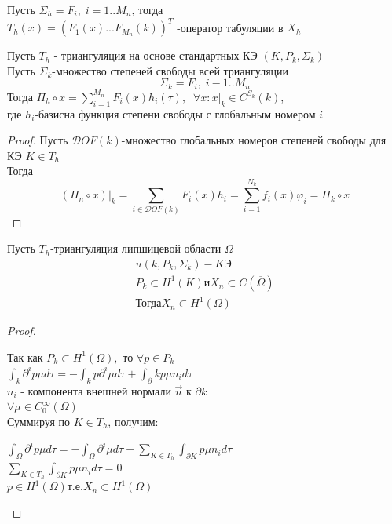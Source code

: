 \documentclass[__main__.tex]{subfiles}
\begin{document}
\begin{definition}
	Пусть $\Sigma_h = {F_i, \; i=1..M_n}$, тогда \\
	$T_h(x) = (F_1(x) ... F_{M_n}(k))^T$ -оператор табуляции в $X_h$
\end{definition}

\begin{theorem}
	Пусть $T_h$ - триангуляция на основе стандартных КЭ $(K, P_k, \Sigma_k)$\\
	Пусть $\Sigma_k$-множество степеней свободы всей триангуляции 
	$$
	\Sigma_k = {F_i, \; i-1..M_n}
	$$
	Тогда $\Pi_h \circ x = \sum_{i=1}^{M_n}F_i(x)h_i(\tau), \;\; \forall x: x|_k \in C^{S_k}(k)$,\\
	где $h_i$-базисна функция степени свободы с глобальным номером $i$
\end{theorem}
\begin{proof}
	Пусть $\mathcal{D}OF(k)$-множество глобальных номеров степеней свободы для КЭ $K \in T_h$\\
	Тогда 
	$$
	(\Pi_n \circ x)|_k = \sum_{i \in \mathcal{D}OF(k)}F_i(x)h_i = \sum_{i=1}^{N_k}f_i(x)\varphi_i = \Pi_k \circ x
		$$
\end{proof}

\begin{theorem}
	Пусть $T_h$-триангуляция липшицевой области $\Omega$
	\begin{gather*}
		u(k, P_k, \Sigma_k) - KЭ\\
		P_k\subset H^1(K) \text{и} X_n \subset C(\overline{\Omega}) \\
		\text{Тогда} X_n \subset H^1(\Omega)
	\end{gather*}
\end{theorem}
\begin{proof}
	\begin{center}
	Так как $P_k \subset H^1(\Omega),$ то $\forall p \in P_k$\\
	$\int_k \partial^i p\mu d\tau = -\int_k p\partial^i \mu d\tau + \int_\partial{k} p\mu n_i d\tau$\\
	$n_i$ - компонента внешней нормали $\vec{n}$ к $\partial{k}$\\
	$\forall \mu \in C_0^\infty (\Omega)$\\
	Суммируя по $K \in T_h$, получим:
	
	$\int_{\Omega} \partial^{i}p\mu d\tau = -\int_{\Omega}\partial^i \mu d\tau + \sum_{K \in T_h} \int_{\partial{K}}p\mu n_i d\tau$\\
	$\sum_{K \in T_h}\int_{\partial{K}}p\mu n_i d\tau = 0$\\
	$p \in H^1(\Omega) \text{т.е.} X_n \subset H^1(\Omega)$
	\end{center}
\end{proof}
\end{document}
